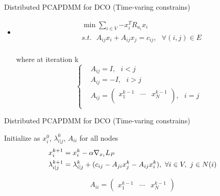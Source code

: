 \documentclass{beamer}
\begin{document}
\begin{frame}{Distributed PCA}{PDMM for DCO (Time-varing constrains)}
\begin{itemize}
\item{

\begin{equation}
\begin{align}
  & \min \sum\limits_{i\in V}{-x_{i}^{T}{{R}_{{{u}_{i}}}}}{{x}_{i}} \\ 
 & s.t.\text{ }{{A}_{ij}}{{x}_{i}}+{{A}_{ij}}{{x}_{j}}={{c}_{ij}},\text{ }\forall (i,j)\in E \\ 
\end{align}
\end{equation}
}
where at iteration k
\begin{equation}
 \left\{ \begin{align}
  & {{A}_{ij}}=I,\text{ }i<j \\ 
 & {{A}_{ij}}=-I,\text{ }i>j \\ 
 & {{A}_{ij}}=\left( \begin{matrix}
   x_{1}^{k-1} & \cdots  & x_{N}^{k-1}  \\
\end{matrix} \right),\text{ }i=j \\ 
\end{align} \right.
\end{equation}
\end{itemize}
\end{frame}



\begin{frame}{Distributed PCA}{PDMM for DCO (Time-varing constrains)}

\begin{algorithm}[H]
			\begin{algorithmic}[1]
			\STATE  Initialize as $ x_{i}^{0} $, $\lambda _{i|j}^{0}$, $ {A_{ii}}$ for all nodes		
			\STATE 	\[\begin{gathered}
  x_i^{k + 1} = x_i^k - \alpha {\nabla _{{x_i}}}{L_P} \hfill \\
  \lambda _{i|j}^{k + 1} = \lambda _{i|j}^k + ({c_{ij}} - {A_{ji}}x_j^k - {A_{ij}}x_i^k),{\text{ }}\forall i \in V,{\text{ }}j \in N(i) \hfill \\ 
\end{gathered} \]		\ENDFOR
	
\[{A_{ii}} = (\begin{array}{*{20}{c}}
  {x_1^{k - 1}}& \cdots &{x_N^{k - 1}} 
\end{array})\]

			\ENDFOR
			\end{algorithmic}
			\caption{PDMM (Time-varing constrains)}
			\label{alg:1}
			\end{algorithm}

\end{frame}
\end{document}
